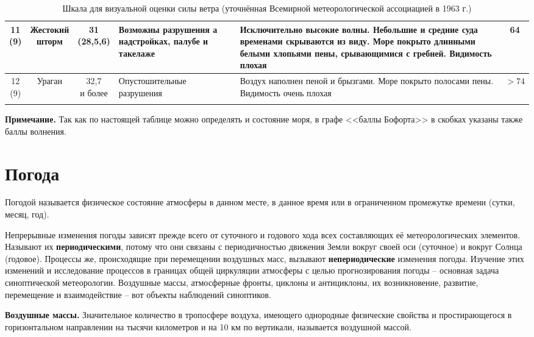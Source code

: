 {\begin{longtable}{c|c|c|p{}|p{}|c}
    \midrule
    \shortstack{11\\(9)} &  \shortstack{Жестокий\\шторм} & \shortstack{31\\(28,5\otdo 32,6)} & Возможны разрушения а надстройках, палубе и такелаже & Исключительно высокие волны. Небольшие и средние суда временами скрываются из виду. Море покрыто длинными белыми хлопьями пены, срывающимися с гребней. Видимость плохая & 64 \\
    \midrule
    \shortstack{12\\(9)} & Ураган & \shortstack{32,7\\и более} & Опустошительные разрушения & Воздух наполнен пеной и брызгами. Море покрыто полосами пены. Видимость очень плохая & $>74$ \\
    \bottomrule
    \caption[Шкала для визуальной оценки силы ветра]{Шкала для визуальной оценки силы ветра (уточнённая Всемирной метеорологической ассоциацией в 1963 г.)}
    \label{tab:6}
  \end{longtable}

  {\small \textbf{Примечание.} Так как по настоящей таблице можно
  определять и состояние моря, в графе <<баллы Бофорта>> в скобках
  указаны также баллы волнения.}
}
  \twocolumn

\section{Погода}

Погодой называется физическое состояние атмосферы в данном месте, в
данное время или в ограниченном промежутке времени (сутки, месяц,
год).

Непрерывные изменения погоды зависят прежде всего от суточного и
годового хода всех составляющих её метеорологических
элементов. Называют их \textbf{периодическими}, потому что они связаны
с периодичностью движения Земли вокруг своей оси (суточное) и вокруг
Солнца (годовое). Процессы же, происходящие при перемещении воздушных
масс, вызывают \textbf{непериодические} изменения погоды. Изучение
этих изменений и исследование процессов в границах общей циркуляции
атмосферы с целью прогнозирования погоды \--- основная задача
синоптической метеорологии. Воздушные массы, атмосферные фронты,
циклоны и антициклоны, их возникновение, развитие, перемещение и
взаимодействие \--- вот объекты наблюдений синоптиков.

\textbf{Воздушные массы.} Значительное
количество в тропосфере воздуха, имеющего однородные физические
свойства и простирающегося в горизонтальном направлении на тысячи
километров и на 10 км по вертикали, называется воздушной
массой.

